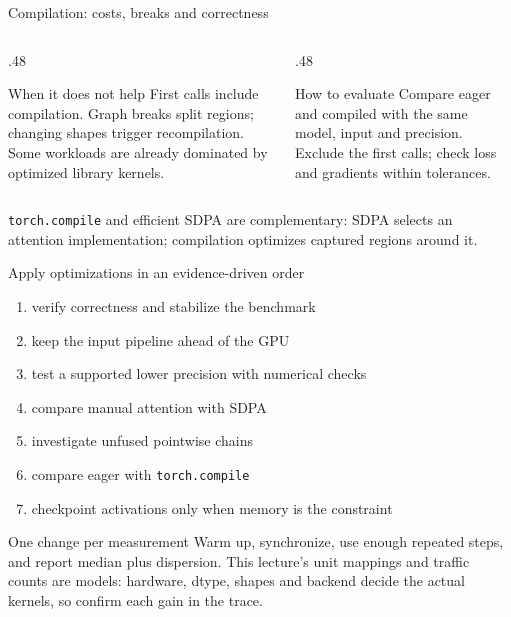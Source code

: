 \documentclass[handout]{beamer}
\begin{document}
\begin{frame}{Compilation: costs, breaks and correctness}
  \begin{columns}[t]
    \begin{column}{.48\linewidth}
      \begin{alertblock}{When it does not help}
        First calls include compilation. Graph breaks split regions; changing shapes trigger recompilation. Some workloads are already dominated by optimized library kernels.
      \end{alertblock}
    \end{column}
    \begin{column}{.48\linewidth}
      \begin{block}{How to evaluate}
        Compare eager and compiled with the same model, input and precision. Exclude the first calls; check loss and gradients within tolerances.
      \end{block}
    \end{column}
  \end{columns}
  \vfill
  \small \texttt{torch.compile} and efficient SDPA are complementary: SDPA selects an attention implementation; compilation optimizes captured regions around it.
\end{frame}

\begin{frame}{Apply optimizations in an evidence-driven order}
  \begin{enumerate}
      \setlength{\itemsep}{2pt}
    \item verify correctness and stabilize the benchmark
    \item keep the input pipeline ahead of the GPU
    \item test a supported lower precision with numerical checks
    \item compare manual attention with SDPA
    \item investigate unfused pointwise chains
    \item compare eager with \texttt{torch.compile}
    \item checkpoint activations only when memory is the constraint
  \end{enumerate}
  \begin{alertblock}{One change per measurement}
    Warm up, synchronize, use enough repeated steps, and report median plus dispersion. This lecture's unit mappings and traffic counts are models: hardware, dtype, shapes and backend decide the actual kernels, so confirm each gain in the trace.
  \end{alertblock}
\end{frame}
\end{document}
